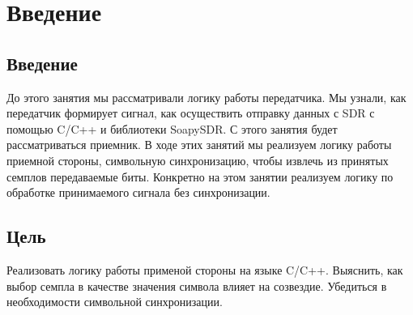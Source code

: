 \chapter{Введение}
\label{ch:intro}

\section{Введение} 

До этого занятия мы рассматривали логику работы передатчика. Мы узнали, как передатчик формирует сигнал, как осуществить
отправку данных с SDR с помощью C/C++ и библиотеки SoapySDR. С этого занятия будет рассматриваться приемник. В ходе этих занятий
мы реализуем логику работы приемной стороны, символьную синхронизацию, чтобы извлечь из принятых семплов передаваемые биты. 
Конкретно на этом занятии реализуем логику по обработке принимаемого сигнала без синхронизации.

\section{Цель}

Реализовать логику работы применой стороны на языке C/C++. Выяснить, как выбор семпла в качестве значения символа влияет на созвездие.
Убедиться в необходимости символьной синхронизации. 

\endinput